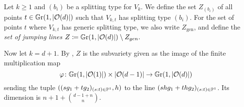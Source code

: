 
\begin{definition}
Let $k \geq 1$ and $(b_i)$ be a splitting type for $V_k$. We define the set
$Z_{(b_i)}$ of all points $t\in\mathbb G \mathrm r(1,\lvert\mathcal{O}(d)\rvert)$ such that $V_{k,t}$ has splitting type $(b_i)$. For the set of points $t$ where $V_{k,t}$ has generic splitting type, we also write $Z_{\text{gen}}$, and define the \emph{set of jumping lines} $Z\coloneqq \mathbb G \mathrm r(1,\lvert\mathcal{O}(d)\rvert) \setminus Z_{gen}.$
\end{definition}

Now let $k=d+1$. By , $Z$ is the subvariety given as the image of the finite multiplication map
$$\varphi \colon \mathbb G \mathrm r(1,\lvert\mathcal{O}(1)\rvert) \times \lvert\mathcal{O}(d-1)\rvert \to \mathbb G \mathrm r(1,\lvert\mathcal{O}(d)\rvert)$$
sending the tuple $((sg_1+tg_2)_{(s:t)\in \mathbb{P}^1},h)$ to the line $(shg_1+thg_2)_{(s:t)\in \mathbb{P}^1}$. Its dimension is $n+1+\binom{d-1+n}{n}$.

%

%

%